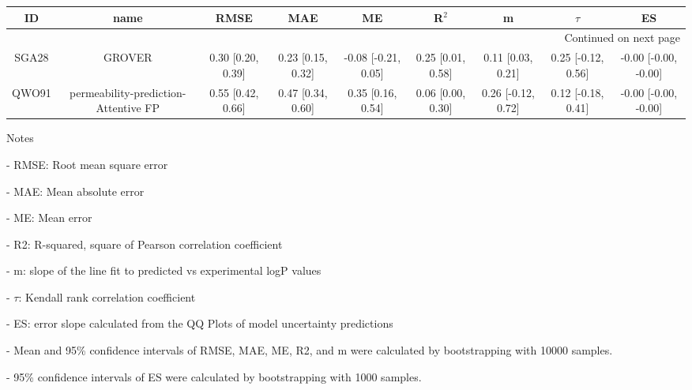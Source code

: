\documentclass{article}
\begin{document}
\begin{center}
\scriptsize
\begin{longtable}{|ccccccccc|}
\toprule
    ID &                                  name &               RMSE &                MAE &                   ME &              R$^2$ &                   m &              $\tau$ &                    ES \\
\midrule
\endhead
\midrule
\multicolumn{9}{r}{{Continued on next page}} \\
\midrule
\endfoot

\bottomrule
\endlastfoot
 SGA28 &                                GROVER &  0.30 [0.20, 0.39] &  0.23 [0.15, 0.32] &  -0.08 [-0.21, 0.05] &  0.25 [0.01, 0.58] &   0.11 [0.03, 0.21] &  0.25 [-0.12, 0.56] &  -0.00 [-0.00, -0.00] \\
 QWO91 &  permeability-prediction-Attentive FP &  0.55 [0.42, 0.66] &  0.47 [0.34, 0.60] &    0.35 [0.16, 0.54] &  0.06 [0.00, 0.30] &  0.26 [-0.12, 0.72] &  0.12 [-0.18, 0.41] &  -0.00 [-0.00, -0.00] \\
\end{longtable}
\end{center}

Notes

- RMSE: Root mean square error

- MAE: Mean absolute error

- ME: Mean error

- R2: R-squared, square of Pearson correlation coefficient

- m: slope of the line fit to predicted vs experimental logP values

- $\tau$:  Kendall rank correlation coefficient

- ES: error slope calculated from the QQ Plots of model uncertainty predictions

- Mean and 95\% confidence intervals of RMSE, MAE, ME, R2, and m were calculated by bootstrapping with 10000 samples.

- 95\% confidence intervals of ES were calculated by bootstrapping with 1000 samples.\end{document}
\end{document}
